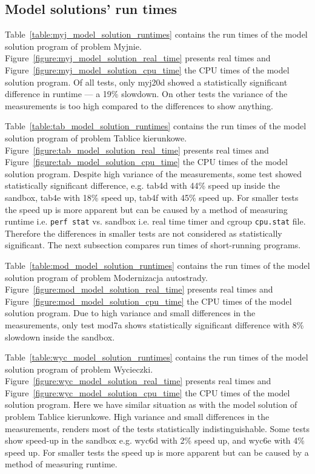 \documentclass[en]{pracamgr}
\begin{document}
\subsection{Model solutions' run times}

Table~\ref{table:myj_model_solution_runtimes} contains the run times of the model solution program of problem Myjnie. Figure~\ref{figure:myj_model_solution_real_time} presents real times and Figure~\ref{figure:myj_model_solution_cpu_time} the CPU times of the model solution program. Of all tests, only myj20d showed a statistically significant difference in runtime --- a 19\% slowdown. On other tests the variance of the measurements is too high compared to the differences to show anything.

Table~\ref{table:tab_model_solution_runtimes} contains the run times of the model solution program of problem Tablice kierunkowe. Figure~\ref{figure:tab_model_solution_real_time} presents real times and Figure~\ref{figure:tab_model_solution_cpu_time} the CPU times of the model solution program. Despite high variance of the measurements, some test showed statistically significant difference, e.g. tab4d with 44\% speed up inside the sandbox, tab4e with 18\% speed up, tab4f with 45\% speed up. For smaller tests the speed up is more apparent but can be caused by a method of measuring runtime i.e. \texttt{perf stat} vs. sandbox i.e. real time timer and cgroup \texttt{cpu.stat} file. Therefore the differences in smaller tests are not considered as statistically significant. The next subsection compares run times of short-running programs.

Table~\ref{table:mod_model_solution_runtimes} contains the run times of the model solution program of problem Modernizacja autostrady. Figure~\ref{figure:mod_model_solution_real_time} presents real times and Figure~\ref{figure:mod_model_solution_cpu_time} the CPU times of the model solution program. Due to high variance and small differences in the measurements, only test mod7a shows statistically significant difference with 8\% slowdown inside the sandbox.

Table~\ref{table:wyc_model_solution_runtimes} contains the run times of the model solution program of problem Wycieczki. Figure~\ref{figure:wyc_model_solution_real_time} presents real times and Figure~\ref{figure:wyc_model_solution_cpu_time} the CPU times of the model solution program. Here we have similar situation as with the model solution of problem Tablice kierunkowe. High variance and small differences in the measurements, renders most of the tests statistically indistinguishable. Some tests show speed-up in the sandbox e.g. wyc6d with 2\% speed up, and wyc6e with 4\% speed up. For smaller tests the speed up is more apparent but can be caused by a method of measuring runtime.
\end{document}
